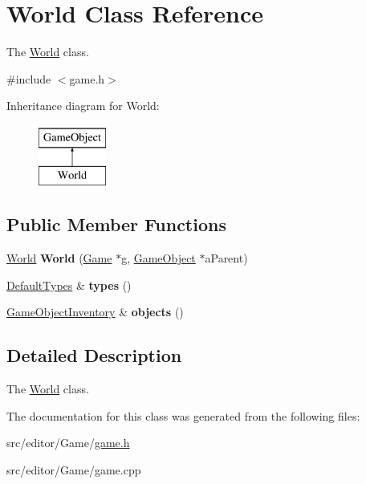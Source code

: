 \hypertarget{class_world}{\section{\-World \-Class \-Reference}
\label{class_world}
}


\-The \hyperlink{class_world}{\-World} class.  




{\ttfamily \#include $<$game.\-h$>$}

\-Inheritance diagram for \-World\-:\begin{figure}[H]
\begin{center}
\leavevmode
\includegraphics[height=2.000000cm]{class_world}
\end{center}
\end{figure}
\subsection*{\-Public \-Member \-Functions}
\begin{DoxyCompactItemize}
\item 
\hypertarget{class_world_aaf77452519079d4370a5f36d5a511006}{\hyperlink{class_world}{\-World} {\bfseries \-World} (\hyperlink{class_game}{\-Game} $\ast$g, \hyperlink{class_game_object}{\-Game\-Object} $\ast$a\-Parent)}\label{class_world_aaf77452519079d4370a5f36d5a511006}

\item 
\hypertarget{class_world_a842b58f52880ec120cc2cc77383f1711}{\hyperlink{class_default_types}{\-Default\-Types} \& {\bfseries types} ()}\label{class_world_a842b58f52880ec120cc2cc77383f1711}

\item 
\hypertarget{class_world_a7cae44942baff3777efcd62c313f8cfb}{\hyperlink{class_game_object_inventory}{\-Game\-Object\-Inventory} \& {\bfseries objects} ()}\label{class_world_a7cae44942baff3777efcd62c313f8cfb}

\end{DoxyCompactItemize}


\subsection{\-Detailed \-Description}
\-The \hyperlink{class_world}{\-World} class. 

\-The documentation for this class was generated from the following files\-:\begin{DoxyCompactItemize}
\item 
src/editor/\-Game/\hyperlink{game_8h}{game.\-h}\item 
src/editor/\-Game/game.\-cpp\end{DoxyCompactItemize}
